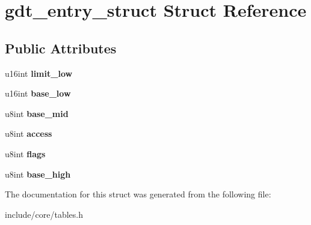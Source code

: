 \hypertarget{structgdt__entry__struct}{}\section{gdt\+\_\+entry\+\_\+struct Struct Reference}
\label{structgdt__entry__struct}
\subsection*{Public Attributes}
\begin{DoxyCompactItemize}
\item 
u16int {\bfseries limit\+\_\+low}\hypertarget{structgdt__entry__struct_ada721fbdc3e8d3feae3b07d4b82a37bd}{}\label{structgdt__entry__struct_ada721fbdc3e8d3feae3b07d4b82a37bd}

\item 
u16int {\bfseries base\+\_\+low}\hypertarget{structgdt__entry__struct_a90f05cd7f227a34e977a639843a23275}{}\label{structgdt__entry__struct_a90f05cd7f227a34e977a639843a23275}

\item 
u8int {\bfseries base\+\_\+mid}\hypertarget{structgdt__entry__struct_a0369f1e190c433425c5b0f40c2070715}{}\label{structgdt__entry__struct_a0369f1e190c433425c5b0f40c2070715}

\item 
u8int {\bfseries access}\hypertarget{structgdt__entry__struct_a7457cb21f29e919a8ea62fc0110ac238}{}\label{structgdt__entry__struct_a7457cb21f29e919a8ea62fc0110ac238}

\item 
u8int {\bfseries flags}\hypertarget{structgdt__entry__struct_afac75bdf53080168c8899c442862410a}{}\label{structgdt__entry__struct_afac75bdf53080168c8899c442862410a}

\item 
u8int {\bfseries base\+\_\+high}\hypertarget{structgdt__entry__struct_aa03c14867c293012449a3b18a07f45f2}{}\label{structgdt__entry__struct_aa03c14867c293012449a3b18a07f45f2}

\end{DoxyCompactItemize}


The documentation for this struct was generated from the following file\+:\begin{DoxyCompactItemize}
\item 
include/core/tables.\+h\end{DoxyCompactItemize}
